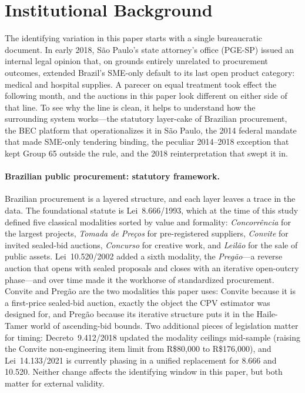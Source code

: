 \documentclass[12pt]{article}
\begin{document}
\section{Institutional Background}
\label{sec:inst}

The identifying variation in this paper starts with a single
bureaucratic document. In early 2018, São Paulo's state attorney's
office (PGE-SP) issued an internal legal opinion that, on grounds
entirely unrelated to procurement outcomes, extended Brazil's
SME-only default to its last open product category: medical and
hospital supplies. A parecer on equal treatment took effect the
following month, and the auctions in this paper look different on
either side of that line. To see why the line is clean, it helps
to understand how the surrounding system works---the statutory
layer-cake of Brazilian procurement, the BEC platform that
operationalizes it in São Paulo, the 2014 federal mandate that
made SME-only tendering binding, the peculiar 2014--2018 exception
that kept Group 65 outside the rule, and the 2018 reinterpretation
that swept it in.

\paragraph{Brazilian public procurement: statutory framework.}
Brazilian procurement is a layered structure, and each layer leaves
a trace in the data. The foundational statute is Lei~8.666/1993,
which at the time of this study defined five classical modalities
sorted by value and formality: \emph{Concorr\^encia} for the
largest projects, \emph{Tomada de Pre\c{c}os} for pre-registered
suppliers, \emph{Convite} for invited sealed-bid auctions,
\emph{Concurso} for creative work, and \emph{Leil\~ao} for the
sale of public assets. Lei~10.520/2002 added a sixth modality,
the \emph{Preg\~ao}---a reverse auction that opens with sealed
proposals and closes with an iterative open-outcry phase---and
over time made it the workhorse of standardized procurement.
Convite and Preg\~ao are the two modalities this paper uses:
Convite because it is a first-price sealed-bid auction, exactly
the object the CPV estimator was designed for, and Preg\~ao
because its iterative structure puts it in the Haile-Tamer world
of ascending-bid bounds. Two additional pieces of legislation
matter for timing: Decreto~9.412/2018 updated the modality
ceilings mid-sample (raising the Convite non-engineering item
limit from R\$80{,}000 to R\$176{,}000), and Lei~14.133/2021 is
currently phasing in a unified replacement for 8.666 and 10.520.
Neither change affects the identifying window in this paper, but
both matter for external validity.
\end{document}
